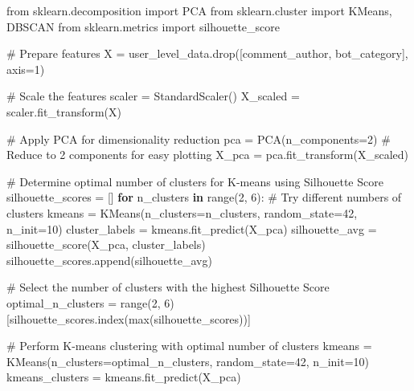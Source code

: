 \documentclass[
  12pt,
  letterpaper,
  DIV=11,
  numbers=noendperiod]{scrartcl}
\newenvironment{Shaded}{\begin{snugshade}}{\end{snugshade}}
\newcommand{\BuiltInTok}[1]{\textcolor[rgb]{0.00,0.23,0.31}{#1}}
\newcommand{\CommentTok}[1]{\textcolor[rgb]{0.37,0.37,0.37}{#1}}
\newcommand{\ControlFlowTok}[1]{\textcolor[rgb]{0.00,0.23,0.31}{\textbf{#1}}}
\newcommand{\DecValTok}[1]{\textcolor[rgb]{0.68,0.00,0.00}{#1}}
\newcommand{\ImportTok}[1]{\textcolor[rgb]{0.00,0.46,0.62}{#1}}
\newcommand{\KeywordTok}[1]{\textcolor[rgb]{0.00,0.23,0.31}{\textbf{#1}}}
\newcommand{\NormalTok}[1]{\textcolor[rgb]{0.00,0.23,0.31}{#1}}
\newcommand{\OperatorTok}[1]{\textcolor[rgb]{0.37,0.37,0.37}{#1}}
\newcommand{\StringTok}[1]{\textcolor[rgb]{0.13,0.47,0.30}{#1}}
\begin{document}
\begin{Shaded}
\begin{Highlighting}[]
\ImportTok{from}\NormalTok{ sklearn.decomposition }\ImportTok{import}\NormalTok{ PCA}
\ImportTok{from}\NormalTok{ sklearn.cluster }\ImportTok{import}\NormalTok{ KMeans, DBSCAN}
\ImportTok{from}\NormalTok{ sklearn.metrics }\ImportTok{import}\NormalTok{ silhouette\_score}

\CommentTok{\# Prepare features}
\NormalTok{X }\OperatorTok{=}\NormalTok{ user\_level\_data.drop([}\StringTok{\textquotesingle{}comment\_author\textquotesingle{}}\NormalTok{, }\StringTok{\textquotesingle{}bot\_category\textquotesingle{}}\NormalTok{], axis}\OperatorTok{=}\DecValTok{1}\NormalTok{)}

\CommentTok{\# Scale the features}
\NormalTok{scaler }\OperatorTok{=}\NormalTok{ StandardScaler()}
\NormalTok{X\_scaled }\OperatorTok{=}\NormalTok{ scaler.fit\_transform(X)}

\CommentTok{\# Apply PCA for dimensionality reduction}
\NormalTok{pca }\OperatorTok{=}\NormalTok{ PCA(n\_components}\OperatorTok{=}\DecValTok{2}\NormalTok{)  }\CommentTok{\# Reduce to 2 components for easy plotting}
\NormalTok{X\_pca }\OperatorTok{=}\NormalTok{ pca.fit\_transform(X\_scaled)}

\CommentTok{\# Determine optimal number of clusters for K{-}means using Silhouette Score}
\NormalTok{silhouette\_scores }\OperatorTok{=}\NormalTok{ []}
\ControlFlowTok{for}\NormalTok{ n\_clusters }\KeywordTok{in} \BuiltInTok{range}\NormalTok{(}\DecValTok{2}\NormalTok{, }\DecValTok{6}\NormalTok{):  }\CommentTok{\# Try different numbers of clusters}
\NormalTok{    kmeans }\OperatorTok{=}\NormalTok{ KMeans(n\_clusters}\OperatorTok{=}\NormalTok{n\_clusters, random\_state}\OperatorTok{=}\DecValTok{42}\NormalTok{, n\_init}\OperatorTok{=}\DecValTok{10}\NormalTok{)}
\NormalTok{    cluster\_labels }\OperatorTok{=}\NormalTok{ kmeans.fit\_predict(X\_pca)}
\NormalTok{    silhouette\_avg }\OperatorTok{=}\NormalTok{ silhouette\_score(X\_pca, cluster\_labels)}
\NormalTok{    silhouette\_scores.append(silhouette\_avg)}

\CommentTok{\# Select the number of clusters with the highest Silhouette Score}
\NormalTok{optimal\_n\_clusters }\OperatorTok{=} \BuiltInTok{range}\NormalTok{(}\DecValTok{2}\NormalTok{, }\DecValTok{6}\NormalTok{)[silhouette\_scores.index(}\BuiltInTok{max}\NormalTok{(silhouette\_scores))]}

\CommentTok{\# Perform K{-}means clustering with optimal number of clusters}
\NormalTok{kmeans }\OperatorTok{=}\NormalTok{ KMeans(n\_clusters}\OperatorTok{=}\NormalTok{optimal\_n\_clusters, random\_state}\OperatorTok{=}\DecValTok{42}\NormalTok{, n\_init}\OperatorTok{=}\DecValTok{10}\NormalTok{)}
\NormalTok{kmeans\_clusters }\OperatorTok{=}\NormalTok{ kmeans.fit\_predict(X\_pca)}


\end{Highlighting}
\end{Shaded}
\end{document}
